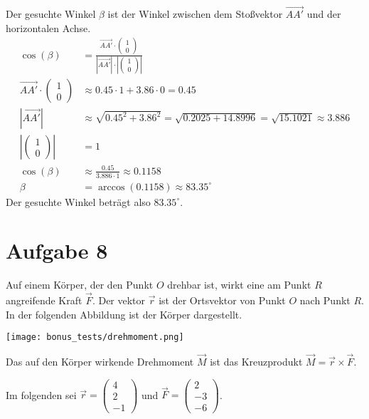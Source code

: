 Der gesuchte Winkel \(\beta\) ist der Winkel zwischen dem Stoßvektor \(\vec{AA'}\) und der horizontalen Achse.
\begin{align*}
    \cos(\beta) &= \frac{\vec{AA'} \cdot \begin{pmatrix} 1 \\ 0 \end{pmatrix}}{|\vec{AA'}| \cdot |\begin{pmatrix} 1 \\ 0 \end{pmatrix}|} \\
    \vec{AA'} \cdot \begin{pmatrix} 1 \\ 0 \end{pmatrix} &\approx 0.45 \cdot 1 + 3.86 \cdot 0 = 0.45 \\
    |\vec{AA'}| &\approx \sqrt{0.45^2 + 3.86^2} = \sqrt{0.2025 + 14.8996} = \sqrt{15.1021} \approx 3.886 \\
    |\begin{pmatrix} 1 \\ 0 \end{pmatrix}| &= 1 \\
    \cos(\beta) &\approx \frac{0.45}{3.886 \cdot 1} \approx 0.1158 \\
    \beta &= \arccos(0.1158) \approx 83.35^\circ
\end{align*}
Der gesuchte Winkel beträgt also \(83.35^\circ\).

\section{Aufgabe 8}

Auf einem Körper, der den Punkt $O$ drehbar ist, wirkt eine am Punkt $R$ angreifende Kraft $\vec{F}$. Der vektor $\vec{r}$ ist der Ortsvektor von Punkt $O$ nach Punkt $R$. In der folgenden Abbildung ist der Körper dargestellt.

\texttt{[image: bonus\_tests/drehmoment.png]}


Das auf den Körper wirkende Drehmoment $\vec{M}$ ist das Kreuzprodukt $\vec{M} = \vec{r} \times \vec{F}$.

Im folgenden sei $\vec{r} = \begin{pmatrix}
        4 \\ 2 \\ -1
    \end{pmatrix}$ und $\vec{F} = \begin{pmatrix}
        2 \\ -3 \\ -6
    \end{pmatrix}$.

